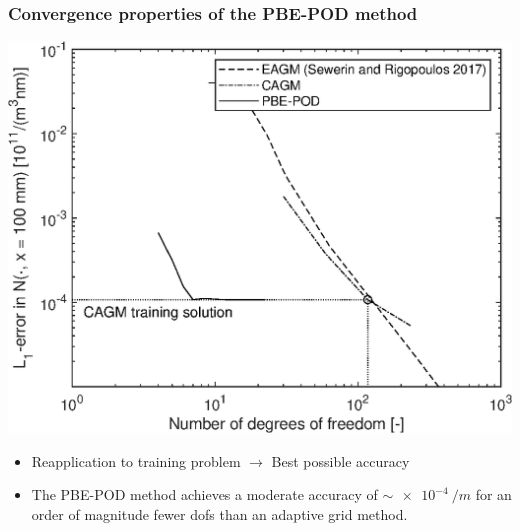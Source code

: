 \documentclass[10pt,xcolor=dvipsnames]{beamer}
\newcommand*{\itemskip}{0.25\baselineskip}
\begin{document}

\begin{frame}[t]

  \frametitle{Convergence properties of the PBE-POD method}

  \begin{center}
  \includegraphics[width=0.65\columnwidth,clip]{fig/plugflow_convergence.eps}
  \end{center}

  \begin{itemize}
  \vspace{\itemskip}
  \item Reapplication to training problem $\longrightarrow$ Best possible accuracy
  \vspace{\itemskip}
  \item The PBE-POD method achieves a moderate accuracy of $\sim\SI{e-4}{/m}$ for an order of magnitude fewer dofs than an adaptive grid method.
  \end{itemize}

\end{frame}

\end{document}
